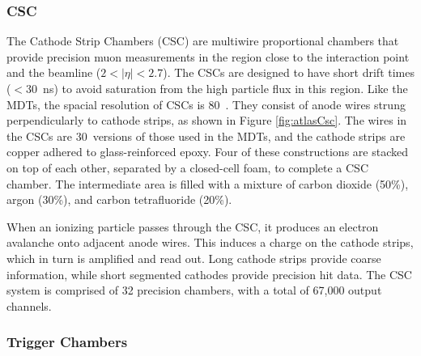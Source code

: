 \cite{muonTdr}

\subsubsection{CSC} %

\begin{figure}[h!]
\captionsetup[subfigure]{position=b}
\centering
{}
\caption{}
\label{fig:}
\end{figure}

The Cathode Strip Chambers (CSC) are multiwire proportional chambers that provide precision muon measurements in the region close to the interaction point and the beamline ($2<|\eta|<2.7$).
The CSCs are designed to have short drift times ($<30$~ns) to avoid saturation from the high particle flux in this region.
Like the MDTs, the spacial resolution of CSCs is 80~\um.
They consist of anode wires strung perpendicularly to cathode strips, as shown in Figure \ref{fig:atlasCsc}.
The wires in the CSCs are 30~\um versions of those used in the MDTs, and the cathode strips are copper adhered to glass-reinforced epoxy.
Four of these constructions are stacked on top of each other, separated by a closed-cell foam, to complete a CSC chamber.
The intermediate area is filled with a mixture of carbon dioxide (50\%), argon (30\%), and carbon tetrafluoride (20\%).

When an ionizing particle passes through the CSC, it produces an electron avalanche onto adjacent anode wires.
This induces a charge on the cathode strips, which in turn is amplified and read out.
Long cathode strips provide coarse information, while short segmented cathodes provide precision hit data.
The CSC system is comprised of 32 precision chambers, with a total of 67,000 output channels.
\cite{muonTdr}

\subsubsection{Trigger Chambers}

